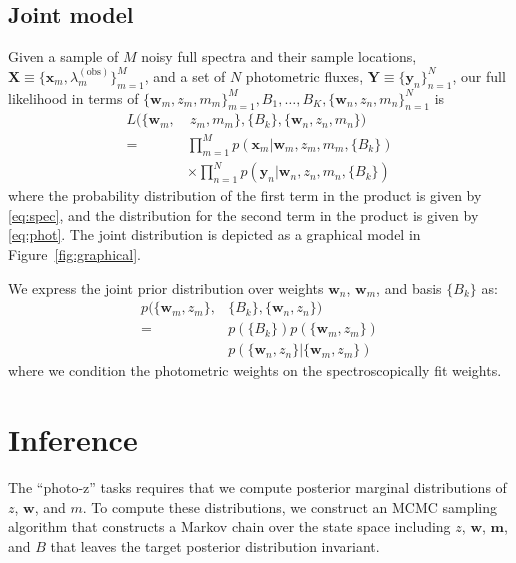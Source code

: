 \documentclass{article}
\begin{document}
\subsection{Joint model}
Given a sample of $M$ noisy full spectra and their sample locations, $\mathbf{X} \equiv \{\mathbf{x}_m, \lambda^{(\text{obs})}_m \}_{m=1}^M$, and a set of $N$ photometric fluxes, $\mathbf{Y} \equiv \{\mathbf{y}_n\}_{n=1}^N$, our full likelihood in terms of $\{ \mathbf{w}_m, z_m, m_m \}_{m=1}^M, B_1, \dots, B_K, \{ \mathbf{w}_n, z_n, m_n \}_{n=1}^N$ is 
\begin{align*}
  L( \{ \mathbf{w}_m, &~z_m, m_m \}, \{ B_k \}, \{ \mathbf{w}_n, z_n, m_n\} )  \\
    = & \prod_{m=1}^M p( \mathbf{x}_m | \mathbf{w}_m, z_m, m_m, \{ B_k \})  \\
      & \times \prod_{n=1}^N p( \mathbf{y}_n | \mathbf{w}_n, z_n, m_n, \{ B_k \})
\end{align*}
where the probability distribution of the first term in the product is given by \ref{eq:spec}, and the distribution for the second term in the product is given by \ref{eq:phot}.  The joint distribution is depicted as a graphical model in Figure~\ref{fig:graphical}.

We express the joint prior distribution over weights $\mathbf{w}_n$, $\mathbf{w}_m$, and basis $\{B_k\}$ as:
\begin{align}
  p( \{ \mathbf{w}_m, z_m \}, &\{ B_k \}, \{ \mathbf{w}_n, z_n \} )  \\
    = & p(\{ B_k \}) p( \{ \mathbf{w}_m, z_m \} )  \\
      & p( \{ \mathbf{w}_n, z_n \} | \{ \mathbf{w}_m, z_m \} ) 
\end{align}
where we condition the photometric weights on the spectroscopically fit weights.  

\section{Inference}
\label{sec:inference}
The ``photo-z'' tasks requires that we compute posterior marginal distributions of $z$, $\mathbf{w}$, and $m$.  To compute these distributions, we construct an MCMC sampling algorithm that constructs a Markov chain over the state space including $z$, $\mathbf{w}$, $\mathbf{m}$, and $B$ that leaves the target posterior distribution invariant.  
 
\end{document}
